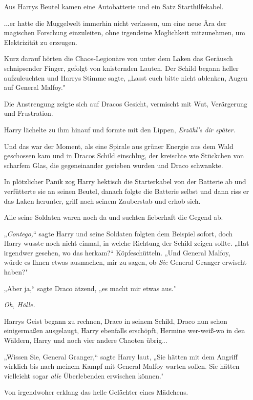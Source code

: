 {Aus Harrys Beutel kamen eine Autobatterie und ein Satz Starthilfekabel.

...er hatte die Muggelwelt immerhin nicht verlassen, um eine neue Ära der magischen Forschung einzuleiten, ohne irgendeine Möglichkeit mitzunehmen, um Elektrizität zu erzeugen.

Kurz darauf hörten die Chaos-Legionäre von unter dem Laken das Geräusch schnipsender Finger, gefolgt von knisternden Lauten. Der Schild begann heller aufzuleuchten und Harrys Stimme sagte, „Lasst euch bitte nicht ablenken, Augen auf General Malfoy."

Die Anstrengung zeigte sich auf Dracos Gesicht, vermischt mit Wut, Verärgerung und Frustration.

Harry lächelte zu ihm hinauf und formte mit den Lippen, \emph{Erzähl's dir später.}

Und das war der Moment, als eine Spirale aus grüner Energie aus dem Wald geschossen kam und in Dracos Schild einschlug, der kreischte wie Stückchen von scharfem Glas, die gegeneinander gerieben wurden und Draco schwankte.

In plötzlicher Panik zog Harry hektisch die Starterkabel von der Batterie ab und verfütterte sie an seinen Beutel, danach folgte die Batterie selbst und dann riss er das Laken herunter, griff nach seinem Zauberstab und erhob sich.

Alle seine Soldaten waren noch da und suchten fieberhaft die Gegend ab.

„\emph{Contego,}“ sagte Harry und seine Soldaten folgten dem Beispiel sofort, doch Harry wusste noch nicht einmal, in welche Richtung der Schild zeigen sollte. „Hat irgendwer gesehen, wo das herkam?“ Köpfeschütteln. „Und General Malfoy, würde es Ihnen etwas ausmachen, mir zu sagen, ob \emph{Sie} General Granger erwischt haben?"

„Aber ja,“ sagte Draco ätzend, „es macht mir etwas aus."

\emph{Oh, Hölle.}

Harrys Geist begann zu rechnen, Draco in seinem Schild, Draco nun schon einigermaßen ausgelaugt, Harry ebenfalls erschöpft, Hermine wer-weiß-wo in den Wäldern, Harry und noch vier andere Chaoten übrig...

„Wissen Sie, General Granger,“ sagte Harry laut, „Sie hätten mit dem Angriff wirklich bis nach meinem Kampf mit General Malfoy warten sollen. Sie hätten vielleicht sogar \emph{alle} Überlebenden erwischen können."

Von irgendwoher erklang das helle Gelächter eines Mädchens.

}
